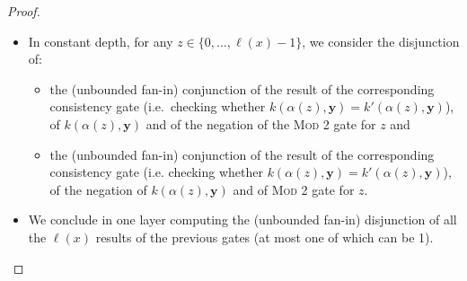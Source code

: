 \documentclass[11pt, oneside]{article}
\newcommand{\Nat}{\mathbb{N}}
\newcommand{\AC}{\mathbf{FAC}}
\newcommand{\FACC}{\mathbf{FACC[2]}}
\newcommand{\tu}[1]{\mathbf{#1}}
\theoremstyle{definition}
\newtheorem{defn}{Definition}
\newtheorem{remark}{Remark}
\newcommand{\ODEACC}{\ell\text{-ODE}_{\text{FACC[2]}}}
\newcommand{\schODE}{\ell\text{-b}_0\text{ODE}}
\begin{document}
\begin{toappendix}
\begin{proof}
\begin{itemize}
    \item In constant depth, for any $z\in \{0,\dots, \ell(x)-1\}$, we consider the disjunction of:
    \begin{itemize}
        \itemsep0em
        \item the (unbounded fan-in) conjunction of the result of the corresponding consistency gate (i.e.~checking whether $k(\alpha(z), \tu y)=k'(\alpha(z), \tu y)$), of $k(\alpha(z), \tu y)$ and of the negation of the \textsc{Mod 2} gate for $z$ and
        \item the (unbounded fan-in) conjunction of the result of the corresponding consistency gate (i.e. checking whether $k(\alpha(z), \tu y)=k'(\alpha(z), \tu y)$), of the negation of $k(\alpha(z), \tu y)$ and of \textsc{Mod 2} gate for $z$.
    \end{itemize}
    \item We conclude in one layer computing the (unbounded fan-in) disjunction of all the $\ell(x)$ results of the previous gates (at most one of which can be 1).
\end{itemize}
\end{proof}







%
%
%




\end{toappendix}
\end{document}
